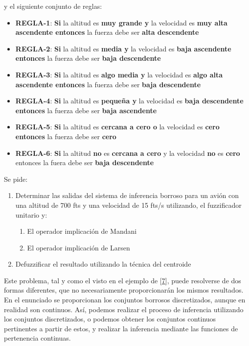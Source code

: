 \documentclass[
]{article}
\providecommand{\tightlist}{%
  \setlength{\itemsep}{0pt}\setlength{\parskip}{0pt}}
\begin{document}
y el siguiente conjunto de reglas:

\begin{itemize}
\item
  \textbf{REGLA-1}: \textbf{Si} la altitud es \textbf{muy grande y} la
  velocidad es \textbf{muy alta ascendente entonces} la fuerza debe ser
  \textbf{alta descendente}
\item
  \textbf{REGLA-2}: \textbf{Si} la altitud es \textbf{media y} la
  velocidad es \textbf{baja ascendente entonces} la fuerza debe ser
  \textbf{baja descendente}
\item
  \textbf{REGLA-3}: \textbf{Si} la altitud es \textbf{algo media y} la
  velocidad es \textbf{algo alta ascendente entonces} la fuerza debe ser
  \textbf{baja descendente}
\item
  \textbf{REGLA-4}: \textbf{Si} la altitud es \textbf{pequeña y} la
  velocidad es \textbf{baja descendente entonces} la fuerza debe ser
  \textbf{baja ascendente}
\item
  \textbf{REGLA-5}: \textbf{Si} la altitud es \textbf{cercana a cero o}
  la velocidad es \textbf{cero entonces} la fuerza debe ser
  \textbf{cero}
\item
  \textbf{REGLA-6}: \textbf{Si} la altitud \textbf{no} es
  \textbf{cercana a cero} y la velocidad \textbf{no} es \textbf{cero}
  entonces la fuera debe ser \textbf{baja descendente}
\end{itemize}

Se pide:

\begin{enumerate}
\def\labelenumi{\arabic{enumi}.}
\tightlist
\item
  Determinar las salidas del sistema de inferencia borroso para un avión
  con una altitud de 700 fts y una velocidad de 15 fts/s utilizando, el
  fuzzificador unitario y:

  \begin{enumerate}
  \def\labelenumii{\alph{enumii}.}
  \tightlist
  \item
    El operador implicación de Mandani
  \item
    El operador implicación de Larsen
  \end{enumerate}
\item
  Defuzzificar el resultado utilizando la técnica del centroide
\end{enumerate}

Este problema, tal y como el visto en el ejemplo de
{[}\protect\hyperlink{ref-BotiaPalmaInferencia}{7}{]}, puede resolverse
de dos formas diferentes, que no necesariamente proporcionarán los
mismos resultados. En el enunciado se proporcionan los conjuntos
borrosos discretizados, aunque en realidad son continuos. Así, podemos
realizar el proceso de inferencia utilizando los conjuntos
discretizados, o podemos obtener los conjuntos continuos pertinentes a
partir de estos, y realizar la inferencia mediante las funciones de
pertenencia continuas.
\end{document}
